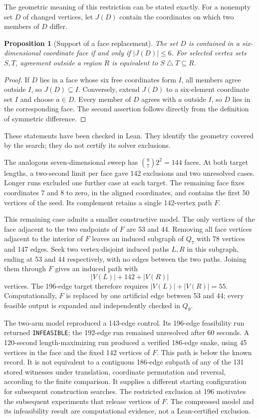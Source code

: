 \documentclass[11pt,a4paper]{article}
\newtheorem{proposition}[theorem]{Proposition}
\theoremstyle{definition}
\theoremstyle{remark}
\begin{document}
The geometric meaning of this restriction can be stated exactly. For a nonempty set $D$ of changed vertices, let $J(D)$ contain the coordinates on which two members of $D$ differ.
\begin{proposition}[Support of a face replacement]
The set $D$ is contained in a six-dimensional coordinate face if and only if $|J(D)|\le6$. For selected vertex sets $S,T$, agreement outside a region $R$ is equivalent to $S\mathbin{\triangle}T\subseteq R$.
\end{proposition}
\begin{proof}
If $D$ lies in a face whose six free coordinates form $I$, all members agree outside $I$, so $J(D)\subseteq I$. Conversely, extend $J(D)$ to a six-element coordinate set $I$ and choose $a\in D$. Every member of $D$ agrees with $a$ outside $I$, so $D$ lies in the corresponding face. The second assertion follows directly from the definition of symmetric difference.
\end{proof}
These statements have been checked in Lean. They identify the geometry covered by the search; they do not certify its solver exclusions.

The analogous seven-dimensional sweep has $\binom97 2^2=144$ faces. At both target lengths, a two-second limit per face gave 142 exclusions and two unresolved cases. Longer runs excluded one further case at each target. The remaining face fixes coordinates 7 and 8 to zero, in the aligned coordinates, and contains the first 50 vertices of the seed. Its complement retains a single 142-vertex path $F$.

This remaining case admits a smaller constructive model. The only vertices of the face adjacent to the two endpoints of $F$ are 53 and 44. Removing all face vertices adjacent to the interior of $F$ leaves an induced subgraph of $Q_7$ with 78 vertices and 147 edges. Seek two vertex-disjoint induced paths $L,R$ in this subgraph, ending at 53 and 44 respectively, with no edges between the two paths. Joining them through $F$ gives an induced path with
\[
|V(L)|+142+|V(R)|
\]
vertices. The 196-edge target therefore requires $|V(L)|+|V(R)|=55$. Computationally, $F$ is replaced by one artificial edge between 53 and 44; every feasible output is expanded and independently checked in $Q_9$.

The two-arm model reproduced a 143-edge control. Its 196-edge feasibility run returned \texttt{INFEASIBLE}; the 192-edge run remained unresolved after 60 seconds. A 120-second length-maximizing run produced a verified 186-edge snake, using 45 vertices in the face and the fixed 142 vertices of $F$. This path is below the known record. It is not equivalent to a contiguous 186-edge subpath of any of the 131 stored witnesses under translation, coordinate permutation and reversal, according to the finite comparison. It supplies a different starting configuration for subsequent construction searches. The restricted exclusion at 196 motivates the subsequent experiments that release vertices of $F$. The compressed model and its infeasibility result are computational evidence, not a Lean-certified exclusion.
\end{document}
